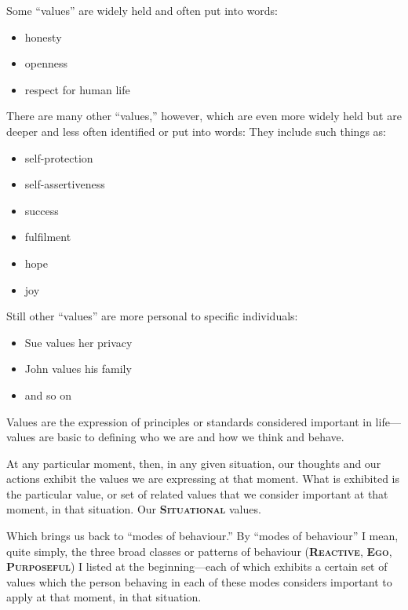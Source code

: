 \documentclass[a5paper]{article}
\begin{document}
Some ``values'' are widely held and often put into words:
\begin{itemize}
  \item honesty
  \item openness
  \item respect for human life
\end{itemize}
There are many other ``values,'' however, which are even more widely held but are deeper and less often identified or put into words: They include such things as:
\begin{itemize}
  \item self-protection
  \item self-assertiveness
  \item success
  \item fulfilment
  \item hope
  \item joy
\end{itemize}
Still other ``values'' are more personal to specific individuals:
\begin{itemize}
  \item Sue values her privacy
  \item John values his family
  \item and so on
\end{itemize}
Values are the expression of principles or standards considered important in life---values are basic to defining who we are and how we think and behave.

At any particular moment, then, in any given situation, our thoughts and our actions exhibit the values we are expressing at that moment.
What is exhibited is the particular value, or set of related values that we consider important at that moment, in that situation.
Our \textbf{\scshape Situational} values.

Which brings us back to ``modes of behaviour.''
By ``modes of behaviour'' I mean, quite simply, the three broad classes or patterns of behaviour (\textbf{\scshape Reactive}, \textbf{\scshape Ego}, \textbf{\scshape Purposeful}) I listed at the beginning---each of which exhibits a certain set of values which the person behaving in each of these modes considers important to apply at that moment, in that situation.
\end{document}
